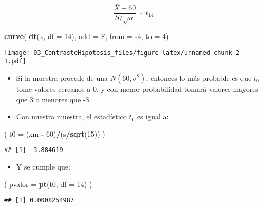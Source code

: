 \documentclass[]{article}
\newenvironment{Shaded}{\begin{snugshade}}{\end{snugshade}}
\newcommand{\KeywordTok}[1]{\textcolor[rgb]{0.13,0.29,0.53}{\textbf{#1}}}
\newcommand{\DataTypeTok}[1]{\textcolor[rgb]{0.13,0.29,0.53}{#1}}
\newcommand{\DecValTok}[1]{\textcolor[rgb]{0.00,0.00,0.81}{#1}}
\newcommand{\StringTok}[1]{\textcolor[rgb]{0.31,0.60,0.02}{#1}}
\newcommand{\OperatorTok}[1]{\textcolor[rgb]{0.81,0.36,0.00}{\textbf{#1}}}
\newcommand{\NormalTok}[1]{#1}
\providecommand{\tightlist}{%
  \setlength{\itemsep}{0pt}\setlength{\parskip}{0pt}}
\begin{document}
\[
\frac{\bar X - 60}{S/\sqrt{n}} \sim t_{14}
\]

\begin{Shaded}
\begin{Highlighting}[]
\KeywordTok{curve}\NormalTok{( }\KeywordTok{dt}\NormalTok{(x, }\DataTypeTok{df =} \DecValTok{14}\NormalTok{), }\DataTypeTok{add =}\NormalTok{ F, }\DataTypeTok{from =} \OperatorTok{-}\DecValTok{4}\NormalTok{, }\DataTypeTok{to =} \DecValTok{4}\NormalTok{)}
\end{Highlighting}
\end{Shaded}

\texttt{[image: 03\_ContrasteHipotesis\_files/figure-latex/unnamed-chunk-2-1.pdf]}

\begin{itemize}
\item
  Si la muestra procede de una \(N(60, \sigma^2)\), entonces lo más
  probable es que \(t_0\) tome valores cercanos a 0, y con menor
  probabilidad tomará valores mayores que 3 o menores que -3.
\item
  Con nuestra muestra, el estadístico \(t_0\) es igual a:
\end{itemize}

\begin{Shaded}
\begin{Highlighting}[]
\NormalTok{( }\DataTypeTok{t0 =}\NormalTok{ (xm }\OperatorTok{-}\StringTok{ }\DecValTok{60}\NormalTok{)}\OperatorTok{/}\NormalTok{(s}\OperatorTok{/}\KeywordTok{sqrt}\NormalTok{(}\DecValTok{15}\NormalTok{)) )}
\end{Highlighting}
\end{Shaded}

\begin{verbatim}
## [1] -3.884619
\end{verbatim}

\begin{itemize}
\tightlist
\item
  Y se cumple que:
\end{itemize}

\begin{Shaded}
\begin{Highlighting}[]
\NormalTok{( }\DataTypeTok{pvalor =} \KeywordTok{pt}\NormalTok{(t0, }\DataTypeTok{df =} \DecValTok{14}\NormalTok{) )}
\end{Highlighting}
\end{Shaded}

\begin{verbatim}
## [1] 0.0008254987
\end{verbatim}
\end{document}
